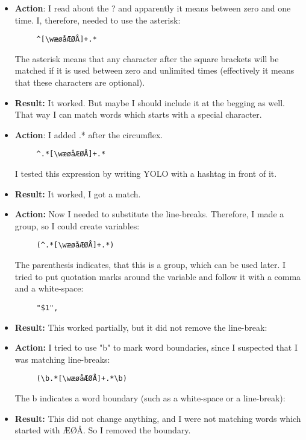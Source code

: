 \documentclass{article}
\begin{document}
\begin{itemize}
\item \textbf{Action}: I read about the ? and apparently it means between zero and one time. I, therefore, needed to use the asterisk: 
\begin{verbatim}
     ^[\wæøåÆØÅ]+.*
\end{verbatim}
The asterisk means that any character after the square brackets will be matched if it is used between zero and unlimited times (effectively it means that these characters are optional).  
\item \textbf{Result:} It worked. But maybe I should include it at the begging as well. That way I can match words which starts with a special character. 

\item \textbf{Action}: I added .* after the circumflex.
\begin{verbatim}
     ^.*[\wæøåÆØÅ]+.*
\end{verbatim}
I tested this expression by writing YOLO with a hashtag in front of it.
\item \textbf{Result:} It worked, I got a match.

\item \textbf{Action:} Now I needed to substitute the line-breaks. Therefore, I made a group, so I could create variables:
\begin{verbatim}
     (^.*[\wæøåÆØÅ]+.*)
\end{verbatim}
The parenthesis indicates, that this is a group, which can be used later. I tried to put quotation marks around the variable and follow it with a comma and a white-space:
\begin{verbatim}
     "$1", 
\end{verbatim}
\item \textbf{Result:} This worked partially, but it did not remove the line-break:

\item \textbf{Action:} I tried to use "b" to mark word boundaries, since I suspected that I was matching line-breaks: 
\begin{verbatim}
     (\b.*[\wæøåÆØÅ]+.*\b)
\end{verbatim}
The b indicates a word boundary (such as a white-space or a line-break):
\item \textbf{Result:} This did not change anything, and I were not matching words which started with ÆØÅ. So I removed the boundary.


\end{itemize}
\end{document}
